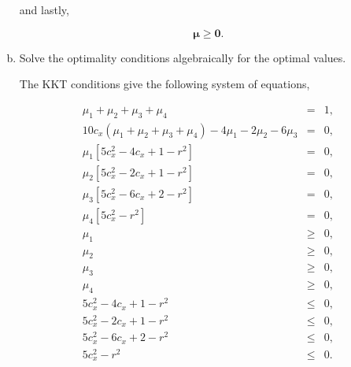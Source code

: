 \documentclass{article}
\begin{document}
\begin{enumerate}[a)]
and lastly,

\begin{equation*}
	\boldsymbol{\mu} \ge \mathbf{0}.
\end{equation*}




\item Solve the optimality conditions algebraically for the optimal values.

The KKT conditions give the following system of equations,

\begin{eqnarray}	
	\mu_1 + \mu_2 + \mu_3 + \mu_4 &=& 1, \label{eq:kkt1}\\
	10c_x(\mu_1 + \mu_2 + \mu_3 + \mu_4) - 4\mu_1 - 2\mu_2 - 6\mu_3 &=& 0, \label{eq:kkt2}\\
	\mu_1 \left[5c_x^2 - 4c_x + 1 -r^2\right] &=& 0, \label{eq:kkt3}\\
	\mu_2 \left[5c_x^2 - 2c_x + 1 -r^2\right] &=& 0, \label{eq:kkt4}\\
	\mu_3 \left[5c_x^2 - 6c_x + 2 -r^2\right] &=& 0, \label{eq:kkt5}\\
	\mu_4 \left[5c_x^2 -r^2\right] &=& 0, \label{eq:kkt6}\\
	\mu_1 &\ge& 0, \\
	\mu_2 &\ge& 0, \\
	\mu_3 &\ge& 0, \\
	\mu_4 &\ge& 0, \\
	5c_x^2 - 4c_x + 1 -r^2 &\le& 0, \label{eq:ineq1}\\
	5c_x^2 - 2c_x + 1 -r^2 &\le& 0, \label{eq:ineq2}\\
	5c_x^2 - 6c_x + 2 -r^2 &\le& 0, \label{eq:ineq3}\\
	5c_x^2 -r^2 &\le& 0. \label{eq:ineq4}
\end{eqnarray}


\end{enumerate}
\end{document}
